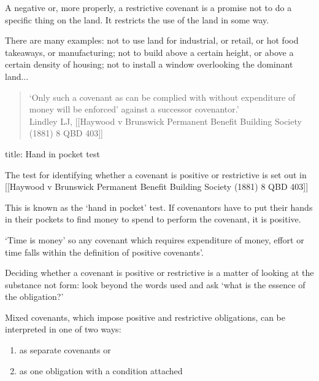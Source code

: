\documentclass[
]{article}
\newenvironment{Shaded}{}{}
\newcommand{\NormalTok}[1]{#1}
\providecommand{\tightlist}{%
  \setlength{\itemsep}{0pt}\setlength{\parskip}{0pt}}
\begin{document}
A negative or, more properly, a restrictive covenant is a promise not to
do a specific thing on the land. It restricts the use of the land in
some way.

\begin{Shaded}
\begin{Highlighting}[]
\NormalTok{There are many examples: not to use land for industrial, or retail, or hot food takeaways, or manufacturing; not to build above a certain height, or above a certain density of housing; not to install a window overlooking the dominant land...}
\end{Highlighting}
\end{Shaded}

\begin{quote}
`Only such a covenant as can be complied with without expenditure of
money will be enforced' against a successor covenantor.'\\
Lindley LJ, {[}{[}Haywood v Brunswick Permanent Benefit Building Society
(1881) 8 QBD 403{]}{]}
\end{quote}

\begin{Shaded}
\begin{Highlighting}[]
\NormalTok{title: Hand in pocket test}

\NormalTok{The test for identifying whether a covenant is positive or restrictive is set out in [[Haywood v Brunswick Permanent Benefit Building Society (1881) 8 QBD 403]]}

\NormalTok{This is known as the ‘hand in pocket’ test. If covenantors have to put their hands in their pockets to find money to spend to perform the covenant, it is positive.}

\NormalTok{‘Time is money’ so any covenant which requires expenditure of money, effort or time falls within the definition of positive covenants’.}
\end{Highlighting}
\end{Shaded}

Deciding whether a covenant is positive or restrictive is a matter of
looking at the substance not form: look beyond the words used and ask
`what is the essence of the obligation?'

Mixed covenants, which impose positive and restrictive obligations, can
be interpreted in one of two ways:

\begin{enumerate}
\def\labelenumi{\arabic{enumi}.}
\tightlist
\item
  as separate covenants or
\item
  as one obligation with a condition attached
\end{enumerate}
\end{document}
